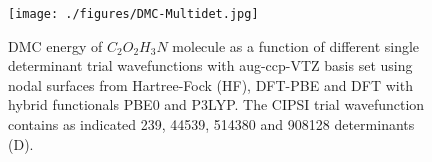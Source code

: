 \begin{figure}
\begin{center}
\texttt{[image: ./figures/DMC-Multidet.jpg]}
\end{center}
\caption{DMC energy of $C_2O_2H_3N$ molecule as a function of different single determinant trial wavefunctions with aug-ccp-VTZ basis set using nodal surfaces from Hartree-Fock (HF), DFT-PBE and DFT with hybrid functionals PBE0 and P3LYP. The CIPSI trial wavefunction contains as indicated 239, 44539, 514380 and 908128 determinants (D). }
\protect{\label{fig:CIPSI-DMC}}

\end{figure}
